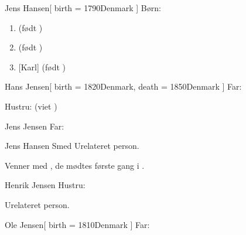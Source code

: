 \documentclass[
	twocolumn
]{article}
\begin{document}
\begin{gprProfile}{Jens Hansen}[
	birth = {1790}{Denmark}
]
	Børn:
	\begin{enumerate}
	\item {} (født )
	\item {} (født )
	\item {}[Karl] (født )
	\end{enumerate}

\end{gprProfile}

\begin{gprProfile}{Hans Jensen}[
	birth = {1820}{Denmark},
	death = {1850}{Denmark}
]
	Far:

	Hustru:
	 (viet )

\end{gprProfile}

\begin{gprProfile}[id=ABC]{Jens Jensen}
	Far:

\end{gprProfile}

\begin{gprProfile}{Jens Hansen Smed}
	Urelateret person.
	
	Venner med , de mødtes første gang i .

\end{gprProfile}

\begin{gprProfile}{Henrik Jensen}
	Hustru:
	
	\lipsum[1-2]

\end{gprProfile}

\begin{gprProfile*}[givenname=Jens, byname=Bødker][birth={1805}{Sverige}]
	Urelateret person.

\end{gprProfile*}



\begin{gprProfile}{Ole Jensen}[
	birth = {1810}{Denmark}
]
	Far:
\end{gprProfile}

\gprCheckReferences{}

\printindex[gpr-id]
\end{document}

